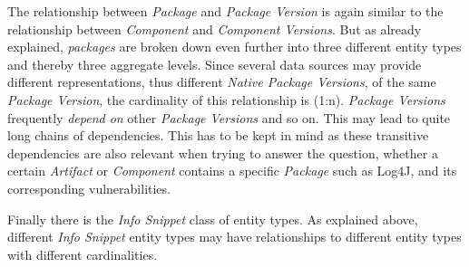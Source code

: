 The relationship between \emph{Package} and \emph{Package Version} is again similar to the relationship between \emph{Component} and \emph{Component Versions}. But as already explained, \emph{packages} are broken down even further into three different entity types and thereby three aggregate levels. Since several data sources may provide different representations, thus different \emph{Native Package Versions}, of the same \emph{Package Version}, the cardinality of this relationship is (1:n). \emph{Package Versions} frequently \emph{depend on} other \emph{Package Versions} and so on. This may lead to quite long chains of dependencies. This has to be kept in mind as these transitive dependencies are also relevant when trying to answer the question, whether a certain \emph{Artifact} or \emph{Component} contains a specific \emph{Package} such as Log4J, and its corresponding vulnerabilities.\par
Finally there is the \emph{Info Snippet} class of entity types. As explained above, different \emph{Info Snippet} entity types may have relationships to different entity types with different cardinalities.

